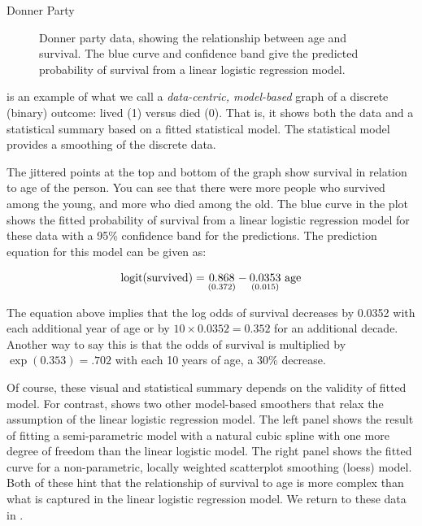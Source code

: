 \documentclass[10pt,krantz2]{krantz}\usepackage[]{graphicx}\usepackage[]{color}
\newenvironment{knitrout}{}{} %
\renewenvironment{knitrout}{\small\renewcommand{\baselinestretch}{.85}}{} %
\begin{document}
\begin{Example}[donner0]{Donner Party}
\begin{knitrout}
\begin{figure}[!htbp]
\caption[Donner party data, showing the relationship between age and survival]{Donner party data, showing the relationship between age and survival. The blue curve and confidence band give the predicted probability of survival from a linear logistic regression model.\label{fig:donner0}}
\end{figure}


\end{knitrout}

 is an example of what we call a \emph{data-centric, model-based}
graph of a discrete (binary) outcome: lived (1) versus died (0). That is, it shows
both the data and a statistical summary based on a fitted statistical model.
The statistical model provides a smoothing of the discrete data.

The jittered points at the top and bottom of the graph show survival in relation
to age of the person.  You can see that there were more people who survived
among the young, and more who died among the old.
The blue curve in the plot shows the fitted probability of survival from
a linear logistic regression model for these data with a 95\% confidence band
for the predictions.  The prediction equation for this model can
be given as:

\begin{equation*}
 \logit ( \mbox{survived} ) =  \cwe{0.868}{0.372} - \cwe{0.0353}{0.015} \mbox{ age}
 \end{equation*}

 The equation above implies that the log odds of survival decreases by 0.0352 with each additional year of
 age or by $10 \times 0.0352 = 0.352$ for an additional decade.
 Another way to say this is that the odds of survival is multiplied by
 $\exp({0.353}) = .702$ with each 10 years of age, a 30\% decrease.

 Of course, these visual and statistical summary depends on the validity of fitted model.
 For contrast,  shows two other model-based smoothers that
 relax the assumption of the linear logistic regression model.
 The left panel shows the result of fitting a semi-parametric model with a
 natural cubic spline with one more degree of freedom than the linear
 logistic model.  The right panel shows the fitted curve for a non-parametric,
 locally weighted scatterplot smoothing (loess) model.  Both of these hint that the relationship of survival to age is
 more complex than what is captured in the linear logistic regression model.
 We return to these data in .



\end{Example}
\end{document}
